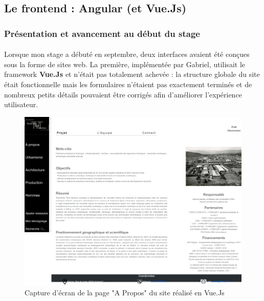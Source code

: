 \subsection{Le frontend : Angular (et Vue.Js)}

\subsubsection{Présentation et avancement au début du stage}
\paragraph{} \hspace{10mm}
Lorsque mon stage a débuté en septembre, deux interfaces avaient été conçues sous la forme de sites web. La première, implémentée par Gabriel, utilisait le framework \textbf{Vue.Js} et n'était pas totalement achevée : la structure globale du site était fonctionnelle mais les formulaires n'étaient pas exactement terminés et de nombreux petits détails pouvaient être corrigés afin d'améliorer l'expérience utilisateur.

\begin{figure} [H]
    \centering
    \includegraphics[width=1\textwidth]{assets/web/screen_main_vue.png}
    \caption{Capture d'écran de la page "A Propos" du site réalisé en Vue.Js}
    \label{fig:screenMainVue}
\end{figure}


